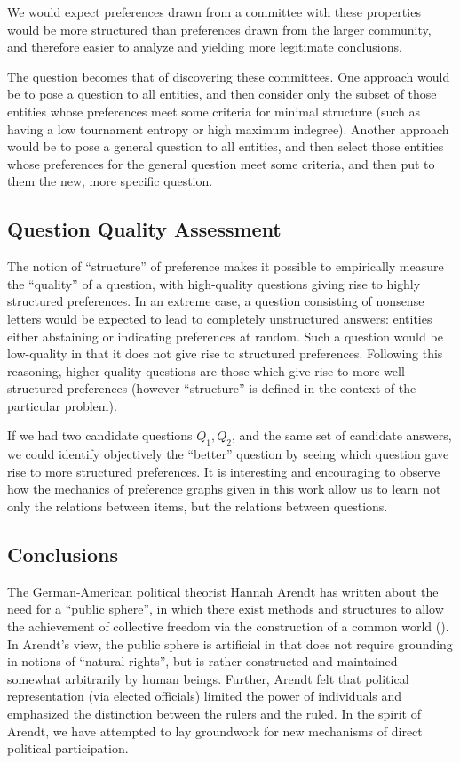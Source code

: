 We would expect preferences drawn from a committee with these properties would be more structured than preferences drawn from the larger community, and therefore easier to analyze and yielding more legitimate conclusions.

\bigskip

The question becomes that of discovering these committees.
One approach would be to pose a question to  all entities, and then consider only the subset of those entities whose preferences meet some criteria for minimal structure (such as having a low tournament entropy or high maximum indegree).
Another approach would be to pose a general question to all entities, and then select those entities whose preferences for the general question meet some criteria, and then put to them the new, more specific question.

\subsection{Question Quality Assessment}

The notion of ``structure'' of preference makes it possible to empirically measure the ``quality'' of a question, with high-quality questions giving rise to highly structured preferences.
In an extreme case, a question consisting of nonsense letters would be expected to lead to completely unstructured answers: entities either abstaining or indicating preferences at random.
Such a question would be low-quality in that it does not give rise to structured preferences.
Following this reasoning, higher-quality questions are those which give rise to more well-structured preferences (however ``structure'' is defined in the context of the particular problem).

If we had two candidate questions $Q_1, Q_2$, and the same set of candidate answers, we could identify objectively the ``better'' question by seeing which question gave rise to more structured preferences.
It is interesting and encouraging to observe how the mechanics of preference graphs given in this work allow us to learn not only the relations between items, but the relations between questions.

\subsection{Conclusions}

The German-American political theorist Hannah Arendt has written about the need for a ``public sphere'', in which there exist methods and structures to allow the achievement of collective freedom via the construction of a common world (\cite{dentreves:2016}).
In Arendt's view, the public sphere is artificial in that does not require grounding in notions of ``natural rights'', but is rather constructed and maintained somewhat arbitrarily by human beings.
Further, Arendt felt that political representation (via elected officials) limited the power of individuals and emphasized the distinction between the rulers and the ruled.
In the spirit of Arendt, we have attempted to lay groundwork for new mechanisms of direct political participation.

